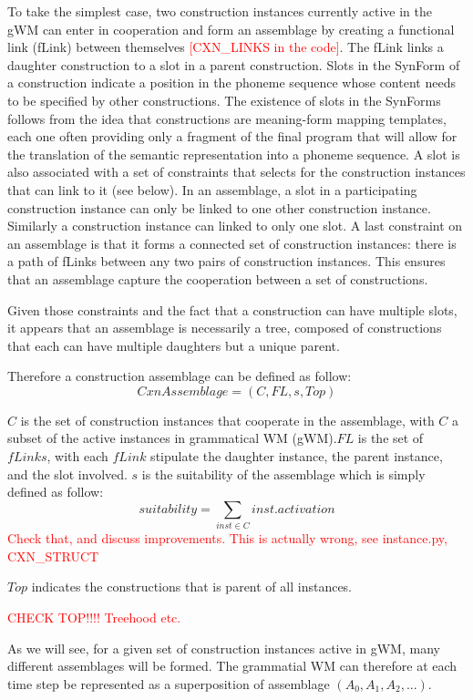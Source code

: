 \documentclass{article}
\newcommand\todo[1]{\textcolor{red}{#1}}
\begin{document}
To take the simplest case, two construction instances currently active in the gWM can enter in cooperation and form an assemblage by creating a functional link (fLink) between themselves \todo{[CXN\_LINKS in the code]}. The fLink links a daughter construction to a slot in a parent construction. Slots in the SynForm of a construction indicate a position in the phoneme sequence whose content needs to be specified by other constructions. The existence of slots in the SynForms follows from the idea that constructions are meaning-form mapping templates, each one often providing only a fragment of the final program that will allow for the translation of the semantic representation into a phoneme sequence. A slot is also associated with a set of constraints that selects for the construction instances that can link to it (see below).
In an assemblage, a slot in a participating construction instance can only be linked to one other construction instance. Similarly a construction instance can linked to only one slot. A last constraint on an assemblage is that it forms a connected set of construction instances: there is a path of fLinks between any two pairs of construction instances. This ensures that an assemblage capture the cooperation between a set of constructions.

Given those constraints and the fact that a construction can have multiple slots, it appears that an assemblage is necessarily a tree, composed of constructions that each can have multiple daughters but a unique parent.

Therefore a construction assemblage can be defined as follow:
$$ CxnAssemblage = (C,FL,s,Top)$$

$C$ is the set of construction instances that cooperate in the assemblage, with $C$ a subset of the active instances in grammatical WM (gWM).$FL$ is the set of $fLinks$, with each $fLink$ stipulate the daughter instance, the parent instance, and the slot involved. $s$ is the suitability of the assemblage which is simply defined as follow:
$$ suitability = \sum\limits_{inst \in C}inst.activation$$
\todo{Check that, and discuss improvements.}
\todo{This is actually wrong, see instance.py, CXN\_STRUCT}

$Top$ indicates the constructions that is parent of all instances.

\todo{CHECK TOP!!!! Treehood etc.}

As we will see, for a given set of construction instances active in gWM, many different assemblages will be formed. The grammatial WM can therefore at each time step be represented as a superposition of assemblage $(A_0, A_1, A_2,...)$.
\end{document}
